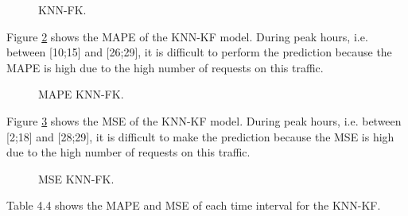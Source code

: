 \begin{figure}[!h]
	\begin{center}
	\end{center}
	\caption{KNN-FK.}
	\label{KNN-FK}
\end{figure}


Figure \ref{MAPE KNN-FK} shows the MAPE of the KNN-KF model. During peak hours, i.e. between [10;15] and [26;29], it is difficult to perform the prediction because the MAPE is high due to the high number of requests on this traffic. 
\begin{figure}[!h]
	\begin{center}
	\end{center}
	\caption{MAPE KNN-FK.}
	\label{MAPE KNN-FK}
\end{figure}

Figure \ref{MSE KNN-FK} shows the MSE of the KNN-KF model. During peak hours, i.e. between [2;18] and [28;29], it is difficult to make the prediction because the MSE is high due to the high number of requests on this traffic.

\begin{figure}[!h]
	\begin{center}
	\end{center}
	\caption{MSE KNN-FK.}
	\label{MSE KNN-FK}
\end{figure}

Table 4.4 shows the MAPE and MSE of each time interval for the KNN-KF.


